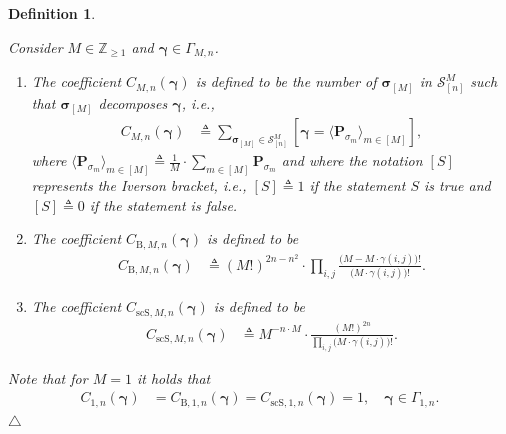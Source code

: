 \documentclass[journal,lettersize,twocolumn]{IEEEtran} %
\newtheorem{definition}[theorem]{Definition}
\newcommand{\edefinition}{\hfill$\triangle$}
\newcommand{\vect}[1]{ \bm{#1} }
\newcommand{\set}[1]{\mathcal{#1}}
\newcommand{\vgam}{ \vect{\gamma} }
\newcommand{\sZpp}{\mathbb{Z}_{\geq 1}}
\newcommand{\matr}[1]{ \bm{#1} }
\newcommand{\defeq}{ \triangleq }
\newcommand{\vsigma}{ \bm{\sigma} }
\newcommand{\setS}{\set{S}}
\newcommand{\CM}[1]{\Cgen{M}{#1}}
\newcommand{\Cgen}[2]{C_{#1,#2}}
\newcommand{\CBM}[1]{\CBgen{M}{#1}}
\newcommand{\CBgen}[2]{C_{\mathrm{B},#1,#2}}
\newcommand{\CscSgen}[2]{C_{\mathrm{scS},#1,#2}}
\newcommand{\mP}{\matr{P}}
\newcommand{\ie}{\textit{i.e.}}
\begin{document}
\begin{definition}
  \label{sec:1:lem:43}

  Consider $M \in \sZpp $ and $ \vgam \in \Gamma_{M,n} $.
  \begin{enumerate}

  \item The coefficient $ \CM{n}( \vgam ) $ is defined to be the
    number of $ \vsigma_{[M]} $ in $ \setS_{[n]}^{M} $ such that
    $ \vsigma_{[M]} $ decomposes $ \vgam $, \ie,
    \begin{align}
      \CM{n}( \vgam )
        &\defeq
           \sum_{ \vsigma_{[M]} \in \setS_{[n]}^{M} }
             \left[ 
               \vgam = \bigl\langle \mP_{\sigma_{m}} \bigr\rangle_{m \in [M]}
             \right],
               \label{sec:1:eqn:56}
    \end{align}
    where
    $\bigl\langle \mP_{\sigma_{m}} \bigr\rangle_{m \in [M]} \defeq \frac{1}{M}
    \cdot \sum\limits_{m\in [M]} \mP_{\sigma_{m}}$ and where the notation
    $[S]$ represents the Iverson bracket, \ie, $[S] \defeq 1$ if the statement
    $S$ is true and $[S] \defeq 0$ if the statement is false.
    
  \item The coefficient $ \CBM{n}(\vgam) $ is defined to be
    \begin{align}
      \CBM{n}(\vgam) 
        &\defeq
           (M!)^{ 2n -  n^2} 
           \cdot
           \prod_{i,j}
             \frac{ \bigl(M - M \cdot \gamma(i,j) \bigr)! }
                  { \bigl(M \cdot \gamma(i,j) \bigr)! } .
        \label{sec:1:eqn:213}
    \end{align}
    
  \item The coefficient $ \CscSgen{M}{n}(\vgam) $ is defined to be
    \begin{align}
      \CscSgen{M}{n}(\vgam)
        &\defeq
           M^{-n\cdot M} 
           \cdot
           \frac{ (M!)^{2n} }
                { \prod_{i,j}
                    \bigl( M \cdot \gamma(i,j) \bigr)! 
                }.
        \label{sec:1:eqn:214}
    \end{align}

  \end{enumerate}
  Note that for $M = 1$ it holds that
  \begin{align*}
    \Cgen{1}{n}(\vgam) 
      &= \CBgen{1}{n}(\vgam) 
       = \CscSgen{1}{n}(\vgam) 
       = 1,
           \quad \vgam \in \Gamma_{1,n}.
  \end{align*}
  \edefinition
\end{definition}
\end{document}
